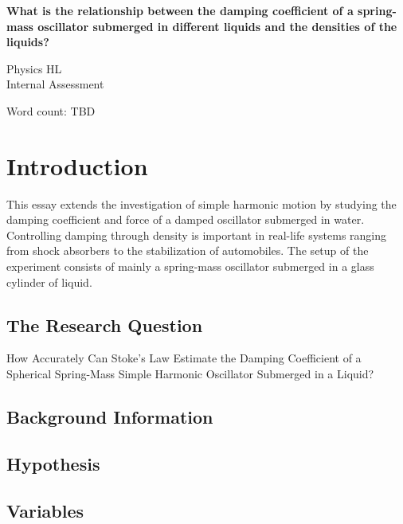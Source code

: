 \documentclass[a4paper,12pt]{article}
\begin{document}
\pagestyle{fancy}


\begin{titlepage}
  \begin{center}
    \vspace*{3cm}

    \textbf{\Large  {What is the relationship between the damping coefficient of a spring-mass oscillator submerged in different liquids and the densities of the liquids?}}

    \vspace{1cm}
    \large{Physics HL}\\
    \large{Internal Assessment}


    \vfill

    \vspace{1.5cm}

    Word count: TBD

  \end{center}
\end{titlepage}
\pagebreak
\tableofcontents
\pagebreak

\clearpage
\setcounter{page}{1}

\section{Introduction}
This essay extends the investigation of simple harmonic motion by studying the damping coefficient and force of a damped oscillator submerged in water. Controlling damping through density is important in real-life systems ranging from shock absorbers to the stabilization of automobiles. The setup of the experiment consists of mainly a spring-mass oscillator submerged in a glass cylinder of liquid.


\subsection{The Research Question}
How Accurately Can Stoke's Law Estimate the Damping Coefficient of a Spherical Spring-Mass Simple Harmonic Oscillator Submerged in a Liquid?
\subsection{Background Information}
\subsection{Hypothesis}
\subsection{Variables}
\end{document}
